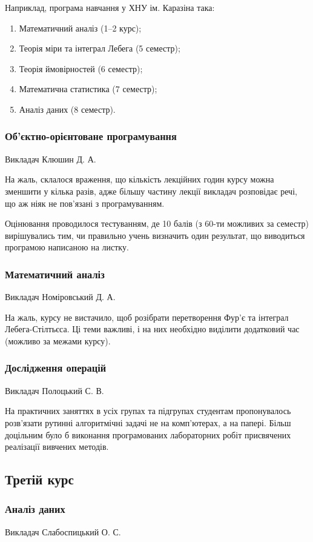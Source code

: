 \documentclass[14pt, a4paper]{extarticle}  %
\begin{document}
Наприклад, програма навчання у ХНУ ім. Каразіна така: 
\begin{enumerate}
    \item Математичний аналіз (1--2 курс);
    \item Теорія міри та інтеграл Лебега (5 семестр);
    \item Теорія ймовірностей (6 семестр);
    \item Математична статистика (7 семестр);
    \item Аналіз даних (8 семестр).
\end{enumerate}

\subsubsection{Об'єктно-орієнтоване програмування}
Викладач Клюшин Д. А.

На жаль, склалося враження, що кількість лекційних годин курсу можна зменшити у кілька разів, адже більшу частину лекції викладач розповідає речі, що аж ніяк не пов'язані з програмуванням. 

Оцінювання проводилося тестуванням, де 10 балів (з 60-ти можливих за семестр) вирішувались тим, чи правильно учень визначить один результат, що виводиться програмою написаною на листку. 

\subsubsection{Математичний аналіз}
Викладач Номіровський Д. А.

На жаль, курсу не вистачило, щоб розібрати перетворення Фур'є та інтеграл Лебега-Стілтьєса. Ці теми важливі, і на них необхідно виділити додатковий час (можливо за межами курсу). 

\subsubsection{Дослідження операцій}
Викладач Полоцький С. В.

На практичних заняттях в усіх групах та підгрупах студентам пропонувалось розв'язати рутинні алгоритмічні задачі не на комп'ю\-терах, а на папері. Більш доцільним було б виконання програмованих лабораторних робіт присвячених реалізації вивчених методів. 

\subsection{Третій курс}
\subsubsection{Аналіз даних}
Викладач Слабоспицький О. С.
\end{document}
